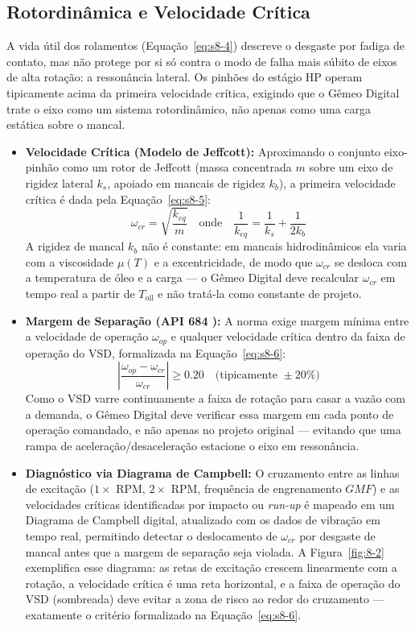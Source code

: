 \documentclass[12pt,a4paper]{article}
\numberwithin{equation}{section}
\numberwithin{table}{section}
\numberwithin{figure}{section}
\begin{document}
	\subsection{\textbf{Rotordinâmica e Velocidade Crítica}}
	A vida útil dos rolamentos (Equação~\eqref{eq:s8-4}) descreve o desgaste por fadiga de contato, mas não protege por si só contra o modo de falha mais súbito de eixos de alta rotação: a ressonância lateral. Os pinhões do estágio HP operam tipicamente acima da primeira velocidade crítica, exigindo que o Gêmeo Digital trate o eixo como um sistema rotordinâmico, não apenas como uma carga estática sobre o mancal.
	\begin{itemize}
		\item \textbf{Velocidade Crítica (Modelo de Jeffcott):} Aproximando o conjunto eixo-pinhão como um rotor de Jeffcott (massa concentrada $m$ sobre um eixo de rigidez lateral $k_s$, apoiado em mancais de rigidez $k_b$), a primeira velocidade crítica é dada pela Equação~\eqref{eq:s8-5}:
		\begin{equation}\label{eq:s8-5}
 \omega_{cr} = \sqrt{\frac{k_{eq}}{m}} \quad \text{onde} \quad \frac{1}{k_{eq}} = \frac{1}{k_s} + \frac{1}{2 k_b}
\end{equation}
		A rigidez de mancal $k_b$ não é constante: em mancais hidrodinâmicos ela varia com a viscosidade $\mu(T)$ e a excentricidade, de modo que $\omega_{cr}$ se desloca com a temperatura de óleo e a carga — o Gêmeo Digital deve recalcular $\omega_{cr}$ em tempo real a partir de $T_{\text{oil}}$ e não tratá-la como constante de projeto.
		\item \textbf{Margem de Separação (API 684 \cite{api684}):} A norma exige margem mínima entre a velocidade de operação $\omega_{op}$ e qualquer velocidade crítica dentro da faixa de operação do VSD, formalizada na Equação~\eqref{eq:s8-6}:
		\begin{equation}\label{eq:s8-6}
 \left| \frac{\omega_{op} - \omega_{cr}}{\omega_{cr}} \right| \geq 0.20 \quad \text{(tipicamente } \pm 20\% \text{)} 
\end{equation}
		Como o VSD varre continuamente a faixa de rotação para casar a vazão com a demanda, o Gêmeo Digital deve verificar essa margem em cada ponto de operação comandado, e não apenas no projeto original — evitando que uma rampa de aceleração/desaceleração estacione o eixo em ressonância.
		\item \textbf{Diagnóstico via Diagrama de Campbell:} O cruzamento entre as linhas de excitação ($1\times$ RPM, $2\times$ RPM, frequência de engrenamento $GMF$) e as velocidades críticas identificadas por impacto ou \textit{run-up} é mapeado em um Diagrama de Campbell digital, atualizado com os dados de vibração em tempo real, permitindo detectar o deslocamento de $\omega_{cr}$ por desgaste de mancal antes que a margem de separação seja violada. A Figura~\ref{fig:8-2} exemplifica esse diagrama: as retas de excitação crescem linearmente com a rotação, a velocidade crítica é uma reta horizontal, e a faixa de operação do VSD (sombreada) deve evitar a zona de risco ao redor do cruzamento — exatamente o critério formalizado na Equação~\eqref{eq:s8-6}.
	\end{itemize}
\end{document}
